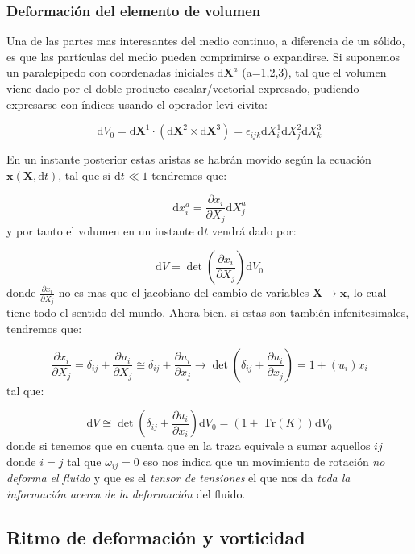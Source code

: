 \documentclass[12pt,a4paper]{article}
\numberwithin{equation}{section}
\numberwithin{figure}{section}
\newcommand{\parentesis}[1]{\left( #1  \right)}
\newcommand{\parciales}[2]{\frac{\partial #1}{\partial #2}}
\newcommand{\D}{\mathrm{d}}
\newcommand{\Tr}{\ \mathrm{Tr}}
\newcommand{\xn}{\mathbf{x}}
\newcommand{\Xn}{\mathbf{X}}
\begin{document}
\subsubsection{Deformación del elemento de volumen}

Una de las partes mas interesantes del medio continuo, a diferencia de un sólido, es que las partículas del medio pueden comprimirse o expandirse. Si suponemos un paralepipedo con coordenadas iniciales $\D \Xn^a$ (a=1,2,3), tal que el volumen viene dado por el doble producto escalar/vectorial expresado, pudiendo  expresarse con índices usando el operador levi-civita:

\begin{equation}
\D V_0 = \D \Xn^1 \cdot (\D \Xn^2 \times \D \Xn^3) = \epsilon_{ijk} \D X^1_i \D X^2_j \D X^3_k
\end{equation}

En un instante posterior estas aristas se habrán movido según la ecuación $\xn(\Xn,\D t)$, tal que si $\D t \ll 1$ tendremos que:

\begin{equation}
\D x_i ^a = \parciales{x_i}{X_j} \D X_j^a
\end{equation}
y por tanto el volumen en un instante $\D  t $ vendrá dado por:

\begin{equation}
\D V = \det \parentesis{\parciales{x_i}{X_j}} \D V_0
\end{equation}
donde $\parciales{x_i}{X_j}$ no es mas que el jacobiano del cambio de variables $\Xn \longrightarrow \xn$, lo cual tiene todo el sentido del mundo. Ahora bien, si estas son también infenitesimales, tendremos que: 

$$ \parciales{x_i}{X_j} = \delta_{ij}  + \parciales{u_i}{X_j} \cong \delta_{ij} + \parciales{u_i}{x_j} \longrightarrow  \det \parentesis{ \delta_{ij} + \parciales{u_i}{x_j}} = 1 + \parentesis{u_i}{x_i} $$
tal que:

\begin{equation}
\D V \cong \det \parentesis{\delta_{ij} + \parciales{u_i}{x_i}} \D V_0 = ( 1 + \Tr ( K)) \D V_0
\end{equation}
donde si tenemos que en cuenta que en la traza equivale a sumar aquellos $ij$ donde $i=j$ tal que $\omega_{ij} = 0$ eso nos indica que un movimiento de rotación \textit{no deforma el fluido} y que es el \textit{tensor de tensiones} el que nos da \textit{toda la información acerca de la deformación} del fluido.

\subsection{Ritmo de deformación y vorticidad}
\end{document}
